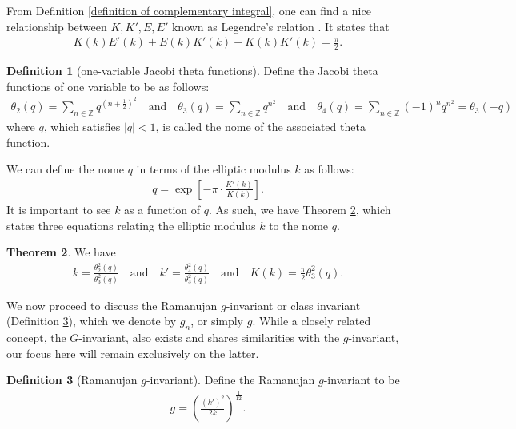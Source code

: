 \documentclass[11pt]{amsart}
\theoremstyle{definition}
\newtheorem{theorem}{Theorem}[section]
\numberwithin{theorem}{section}
\newtheorem{definition}[theorem]{Definition}
\begin{document}
From Definition \ref{definition of complementary integral}, one can find a nice relationship between $K,K',E,E'$ known as Legendre's relation \cite{Jesus}. It states that \begin{align}\label{eqn: Legendre relation}
K\left(k\right)E'\left(k\right)+E\left(k\right)K'\left(k\right)-K\left(k\right)K'\left(k\right)=\frac{\pi}{2}.
\end{align}
\begin{definition}[one-variable Jacobi theta functions] Define the Jacobi theta functions of one variable to be as follows: \begin{align*}
        \theta_2\left(q\right)=\sum_{n\in\mathbb{Z}}q^{\left(n+\frac{1}{2}\right)^2}\quad\text{and}\quad \theta_3\left(q\right)=\sum_{n\in\mathbb{Z}}q^{n^2}\quad\text{and}\quad\theta_4\left(q\right)=\sum_{n\in\mathbb{Z}}\left(-1\right)^nq^{n^2}=\theta_3\left(-q\right)
    \end{align*}
where $q$, which satisfies $\left|q\right|<1$, is called the nome of the associated theta function.
\end{definition}
We can define the nome $q$ in terms of the elliptic modulus $k$ as follows:
    \begin{align*}
        q=\operatorname{exp}\left[-\pi\cdot \frac{K'\left(k\right)}{K\left(k\right)}\right].
    \end{align*} 
It is important to see $k$ as a function of $q$. As such, we have Theorem \ref{elliptic modulus and nome relation}, which states three equations relating the elliptic modulus $k$ to the nome $q$.
\begin{theorem}\label{elliptic modulus and nome relation} We have
    \begin{align*}
        k=\frac{\theta_2^2\left(q\right)}{\theta_3^2\left(q\right)}\quad\text{and}\quad k'=\frac{\theta_4^2\left(q\right)}{\theta_3^2\left(q\right)}\quad\text{and}\quad K\left(k\right)=\frac{\pi}{2}\theta_3^2\left(q\right).
    \end{align*}
\end{theorem}
We now proceed to discuss the Ramanujan $g$-invariant or class invariant (Definition \ref{ramanujan g invariant}), which we denote by $g_n$, or simply $g$. While a closely related concept, the $G$-invariant, also exists and shares similarities with the $g$-invariant, our focus here will remain exclusively on the latter.
\begin{definition}[Ramanujan $g$-invariant]\label{ramanujan g invariant}
    Define the Ramanujan $g$-invariant to be
    \begin{align*}
        g=\left(\frac{\left(k'\right)^2}{2k}\right)^{\frac{1}{12}}.
    \end{align*}
\end{definition}
\end{document}
